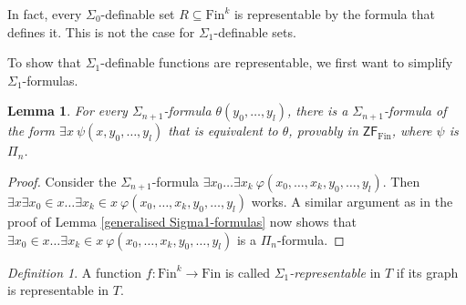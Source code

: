 \documentclass[a4paper, 11pt]{amsart}
\newtheorem{lemma}[lemma]{Lemma}
\theoremstyle{remark}
\newtheorem{definition}[definition]{Definition}
\newcommand{\axiomft}[1]{\mathsf{#1}}
\newcommand{\ZF}{\axiomft{ZF}}
\newcommand{\Fin}{\mathrm{Fin}}
\begin{document}
In fact, every $\Sigma_0$-definable set $R\subseteq \Fin^k$ is representable by the formula that defines it. 
This is not the case for $\Sigma_1$-definable sets. 


To show that $\Sigma_1$-definable functions are representable, we first want to simplify $\Sigma_1$-formulas. 

\begin{lemma} 
\label{Sigma1-formulas with one quantifier} 
For every $\Sigma_{n+1}$-formula $\theta(y_0,\dots,y_l)$, there is a $\Sigma_{n+1}$-formula of the form $\exists x\ \psi(x,y_0,\dots,y_l)$ that is equivalent to $\theta$, provably in $\ZF_\Fin$, where $\psi$ is $\Pi_n$. 
\end{lemma} 
\begin{proof} 
Consider the $\Sigma_{n+1}$-formula $\exists x_0\dots \exists x_k\ \varphi(x_0,\dots,x_k,y_0,\dots,y_l)$. 
Then $\exists x \exists x_0\in x \dots \exists x_k\in x\ \varphi(x_0,\dots,x_k,y_0,\dots,y_l)$ works. 
A similar argument as in the proof of Lemma \ref{generalised Sigma1-formulas} now shows that $\exists x_0\in x \dots \exists x_k\in x\ \varphi(x_0,\dots,x_k,y_0,\dots,y_l)$ is a $\Pi_n$-formula. 
\end{proof} 

\begin{definition} 
A function $f\colon \Fin^k\rightarrow \Fin$ is called \emph{$\Sigma_1$-representable} in $T$ if its graph is representable in $T$. 
\end{definition} 
\end{document}

